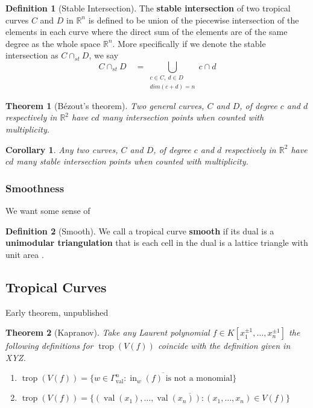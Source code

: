 \documentclass[12pt,a4paper]{amsart}
\newcommand{\trop}[1]{\operatorname{trop}(#1)}
\newcommand{\val}[1]{\operatorname{val}(#1)}
\newcommand{\Gval}{\Gamma_{\operatorname{val}}}
\newcommand{\init}[2]{\operatorname{in}_{#1}(#2)}
\newcommand{\initw}[1]{\init{w}{#1}}
\newcommand{\st}[2]{#1\cap_{st} #2}
\newcommand{\R}{\mathbb{R}}
\newtheorem{thm}{Theorem}[section]
\newtheorem{cor}{Corollary}[thm]
\theoremstyle{definition}
\newtheorem{defn}{Definition}[section]
\theoremstyle{remark}
\begin{document}
\begin{defn}[Stable Intersection]
The \textbf{stable intersection} of two tropical curves $C$ and $D$ in $\R^n$ is defined to be union of the piecewise intersection of the elements in each curve where the direct sum of the elements are of the same degree as the whole space $\R^n$. More specifically if we denote the stable intersection as $\st{C}{D}$, we say
\begin{equation}
    \st{C}{D} \quad = \bigcup_{\substack{c\in C,\ d\in D \\ dim(c+d)=n}}c\cap d
\end{equation}
\end{defn}

\begin{thm}[Bézout's theorem]
Two general curves, $C$ and $D$, of degree $c$ and $d$ respectively in $\R^2$ have $c d$ many intersection points when counted with multiplicity.
\end{thm}

\begin{cor}
Any two curves, $C$ and $D$, of degree $c$ and $d$ respectively in $\R^2$ have $c d$ many stable intersection points when counted with multiplicity.
\end{cor}

\subsubsection{Smoothness}

We want some sense of 

\begin{defn}[Smooth]
We call a tropical curve \textbf{smooth} if its dual is a \textbf{unimodular triangulation} that is each cell in the dual is a lattice triangle with unit area \textonehalf.
\end{defn}

\subsection{Tropical Curves}

Early theorem, unpublished

\begin{thm}[Kapranov]
Take any Laurent polynomial $f\in K[x_1^{\pm1},\dots,x_n^{\pm1}]$ the following definitions for $\trop{V(f)}$ coincide with the definition given in XYZ.
\begin{enumerate}
    \item $\trop{V(f)} = \overline{\{ w\in\Gval^n : \initw{f}\text{ is not a monomial} \}}$
    \item $\trop{V(f)} = \overline{\{ (\val{x_1},\dots,\val{x_n}) : (x_1,\dots,x_n)\in V(f) \}}$
\end{enumerate}
\end{thm}
\end{document}
